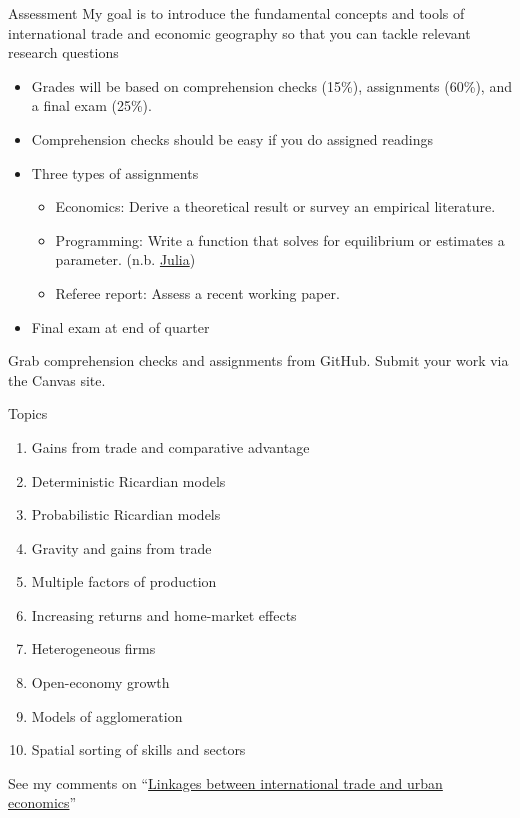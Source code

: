 \documentclass[10pt,notes=hide]{beamer}
\begin{document}
\begin{frame}{Assessment}
My goal is to introduce the fundamental concepts and tools of international trade and economic geography so that you can tackle relevant research questions
\begin{itemize}
\item Grades will be based on comprehension checks (15\%), assignments (60\%), and a final exam (25\%).
\item Comprehension checks should be easy if you do assigned readings
\item Three types of assignments
\begin{itemize}
\item Economics: Derive a theoretical result or survey an empirical literature.
\item Programming: Write a function that solves for equilibrium or estimates a parameter. (n.b. \href{https://tradediversion.net/2018/09/17/why-i-encourage-econ-phd-students-to-learn-julia/}{Julia})
\item Referee report: Assess a recent working paper.
\end{itemize}
\item Final exam at end of quarter
\end{itemize}
Grab comprehension checks and assignments from GitHub.
Submit your work via the Canvas site.
\end{frame}
\begin{frame}{Topics}
\begin{enumerate}
\item Gains from trade and comparative advantage
\item Deterministic Ricardian models
\item Probabilistic Ricardian models
\item Gravity and gains from trade
\item Multiple factors of production
\item Increasing returns and home-market effects
\item Heterogeneous firms
\item Open-economy growth
\item Models of agglomeration
\item Spatial sorting of skills and sectors
\end{enumerate}
See my comments on ``\href{https://tradediversion.net/2017/09/17/linkages-between-international-trade-and-urban-economics/}{Linkages between international trade and urban economics}''
\end{frame}
\end{document}
